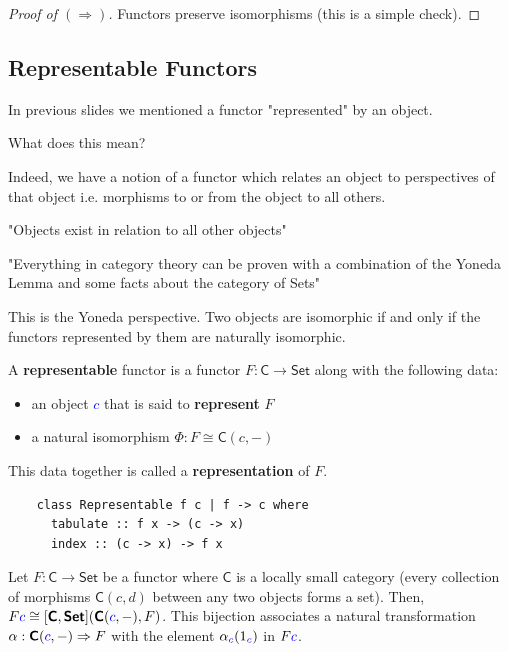 \documentclass[tikz]{beamer}
\newcommand{\cat}[1]{\bm{ \mathsf{#1} }}
\newcommand{\cc}{\cat{C}}
\newcommand{\blue}[1]{\textcolor{blue}{#1}}
\newcommand{\mblue}[1]{\textcolor{blue}{$#1$}}
\theoremstyle{definition}
\begin{document}
\frame
{
	\begin{proof}[Proof of $(\Rightarrow)$]
		Functors preserve isomorphisms (this is a simple check).
	\end{proof}
}

\subsection{Representable Functors}

\frame
{
	In previous slides we mentioned a functor "represented" by an object.
}

\frame
{
	What does this mean? 
}


\frame
{
	Indeed, we have a notion of a functor which relates an object to perspectives of that object i.e. morphisms to or from the object to all others. 
}

\frame
{
	"Objects exist in relation to all other objects" 
}

\frame
{
	"Everything in category theory can be proven with a combination of the Yoneda Lemma and some facts about the category of Sets" 
}

\frame
{
	This is the Yoneda perspective. Two objects are isomorphic if and only if the functors represented by them are naturally isomorphic.	
}

\frame
{
	\begin{definition}
		A \textbf{representable} functor is a functor $F : \cc \to \cat{Set}$ along with the following data: 
		
		\begin{itemize}
			\item an object \mblue{c} that is said to \textbf{represent} $F$
			\item a natural isomorphism $\Phi : F \cong \cc(c, -)$
		\end{itemize}
		
		This data together is called a \textbf{representation} of $F$. 
	\end{definition}
}

\begin{frame}[fragile]

	\begin{verbatim}
	class Representable f c | f -> c where
	  tabulate :: f x -> (c -> x)
	  index :: (c -> x) -> f x
	\end{verbatim}
\end{frame}

\frame
{
	\begin{definition}
		Let $F : \cc \to \cat{Set}$ be a functor where $\cc$ is a locally small category (every collection of morphisms $\cc(c, d)$ between any two objects forms a set). Then, $F\blue{c} \cong [\cc, \cat{Set}](\cc(\blue{c}, -), F)$. This bijection associates a natural transformation $\alpha : \cc(\blue{c}, -) \Rightarrow F$ with the element $\alpha_{\blue{c}}(1_{\blue{c}})$ in $F\blue{c}$. 
	\end{definition}
}
\end{document}
